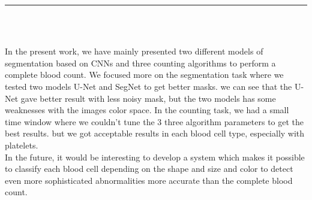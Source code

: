 \vspace*{0.2in}

\begin{center}
    {\color{Black} \rule{4in}{1.4mm} }\\
    \vspace{0.1in}
    \scshape{\fontsize{34}{46}{\bfseries{\color{Black}{Conclusion}}}}
    \\
    \vspace{0.6in}
\end{center}
\begin{changemargin}{0.9cm}{0.9cm}
\hspace*{0.16in}
\end{changemargin}

In the present work, we have mainly presented two different models of segmentation based on CNNs and three counting algorithms to perform a complete blood count.
We focused more on the segmentation task where  we tested two models U-Net and SegNet to get better masks. we can see that the U-Net gave better result with less noisy mask, but the two models has some weaknesses with the images color space.
In the counting task, we had a small time window where we couldn't tune the 3 three algorithm parameters to get the best results. but we got acceptable results in each blood cell type, especially with platelets.\\

In the future, it would be interesting to develop a system which makes it possible to classify each blood cell depending on the shape and size and color to detect even more sophisticated abnormalities more accurate than the complete blood count.
